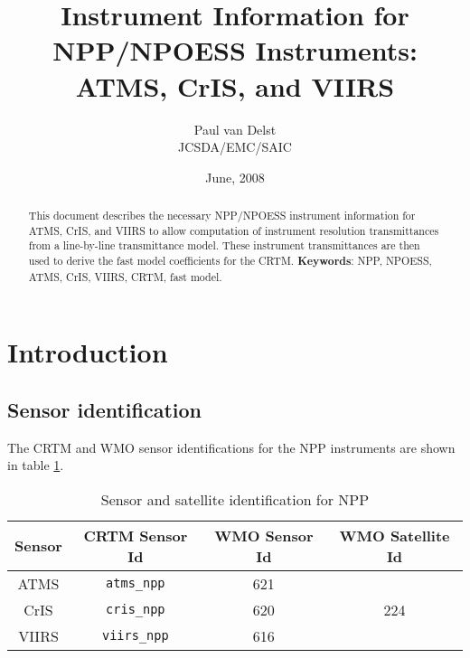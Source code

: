 




\newcommand{\frequency}[1]{\ensuremath{f_{#1}}}
\newcommand{\bfrequency}[1]{\boldmath\frequency{#1}\unboldmath}
\newcommand{\bdf}[1]{\boldmath\df{#1}\unboldmath}
\newcommand{\sideband}[1]{\ensuremath{df_{#1}}}
\newcommand{\bsideband}[1]{\boldmath\sideband{#1}\unboldmath}

\title{Instrument Information for NPP/NPOESS Instruments: ATMS, CrIS, and VIIRS}
\author{Paul van Delst\\JCSDA/EMC/SAIC}
\date{June, 2008}



\maketitle

\draftwatermark

\begin{abstract}
This document describes the necessary NPP/NPOESS instrument information for ATMS, CrIS, and VIIRS to allow computation of instrument resolution transmittances from a line-by-line transmittance model. These instrument transmittances are then used to derive the fast model coefficients for the CRTM.
\textbf{Keywords}: NPP, NPOESS, ATMS, CrIS, VIIRS, CRTM, fast model.
\end{abstract}

\section{Introduction}

\subsection{Sensor identification}
The CRTM and WMO\cite{WMO_Common_Code_Tables} sensor identifications for the NPP instruments are shown in table \ref{tab:npp_sensor_id}.
\begin{table}[htp]
  \centering
  \begin{tabular}{|c|c|c|c|}
    \hline
    \textbf{Sensor} & \textbf{CRTM Sensor Id} & \textbf{WMO Sensor Id} & \textbf{WMO Satellite Id} \\
    \hline\hline
    ATMS  & \texttt{atms\_npp}  & 621 &            \\
    CrIS  & \texttt{cris\_npp}  & 620 & 224 \\
    VIIRS & \texttt{viirs\_npp} & 616 &            \\
    \hline
  \end{tabular}
  \caption{Sensor and satellite identification for NPP}
  \label{tab:npp_sensor_id}
\end{table}


